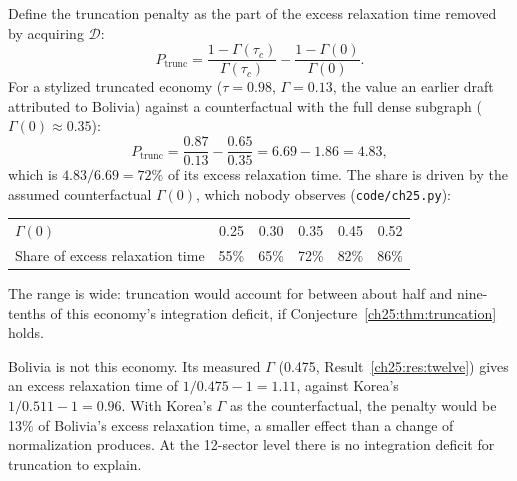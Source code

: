 \documentclass[../structural_economics_book.tex]{subfiles}
\begin{document}
\begin{example}\label{ch25:thm:penalty}
Define the truncation penalty as the part of the excess relaxation time removed by acquiring $\mathcal{D}$:
\begin{equation}\label{ch25:eq:penalty}
P_{\text{trunc}} = \frac{1-\Gamma(\tau_c)}{\Gamma(\tau_c)} - \frac{1-\Gamma(0)}{\Gamma(0)}.
\end{equation}
For a stylized truncated economy ($\tau = 0.98$, $\Gamma = 0.13$, the value an earlier draft attributed to Bolivia) against a counterfactual with the full dense subgraph ($\Gamma(0) \approx 0.35$):
\begin{equation}
P_{\text{trunc}} = \frac{0.87}{0.13} - \frac{0.65}{0.35} = 6.69 - 1.86 = 4.83,
\end{equation}
which is $4.83/6.69 = 72\%$ of its excess relaxation time. The share is driven by the assumed counterfactual $\Gamma(0)$, which nobody observes (\texttt{code/ch25.py}):
\begin{center}
\begin{tabular}{lccccc}
\toprule
$\Gamma(0)$ & 0.25 & 0.30 & 0.35 & 0.45 & 0.52 \\
Share of excess relaxation time & 55\% & 65\% & 72\% & 82\% & 86\% \\
\bottomrule
\end{tabular}
\end{center}
The range is wide: truncation would account for between about half and nine-tenths of this economy's integration deficit, if Conjecture~\ref{ch25:thm:truncation} holds.

Bolivia is not this economy. Its measured $\Gamma$ (0.475, Result~\ref{ch25:res:twelve}) gives an excess relaxation time of $1/0.475 - 1 = 1.11$, against Korea's $1/0.511 - 1 = 0.96$. With Korea's $\Gamma$ as the counterfactual, the penalty would be 13\% of Bolivia's excess relaxation time, a smaller effect than a change of normalization produces. At the 12-sector level there is no integration deficit for truncation to explain.
\end{example}
\end{document}
